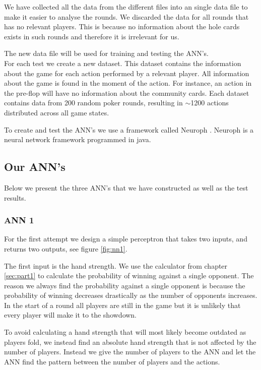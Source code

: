 We have collected all the data from the different files into an single data file to make it easier to analyse the rounds. We discarded the data for all rounds that has no relevant players. This is because no information about the hole cards exists in such rounds and therefore it is irrelevant for us. 

The new data file will be used for training and testing the ANN's.\\

For each test we create a new dataset. This dataset contains the information about the game for each action performed by a relevant player. All information about the game is found in the moment of the action. For instance, an action in the pre-flop will have no information about the community cards.
Each dataset contains data from 200 random poker rounds, resulting in $\sim$1200 actions distributed across all game states.

To create and test the ANN's we use a framework called Neuroph \cite{neuroph}. Neuroph is a neural network framework programmed in java. 

\subsection{Our ANN's}
Below we present the three ANN's that we have constructed as well as the test results. 
\subsubsection{ANN 1}
\label{sec:design1}
For the first attempt we design a simple perceptron that takes two inputs, and returns two outputs, see figure \ref{fig:nn1}. 


The first input is the hand strength. We use the calculator from chapter \ref{sec:part1} to calculate the probability of winning against a single opponent. The reason we always find the probability against a single opponent is because the probability of winning decreases drastically as the number of opponents increases. In the start of a round all players are still in the game but it is unlikely that every player will make it to the showdown.

To avoid calculating a hand strength that will most likely become outdated as players fold, we instead find an absolute hand strength that is not affected by the number of players. Instead we give the number of players to the ANN and let the ANN find the pattern between the number of players and the actions.

